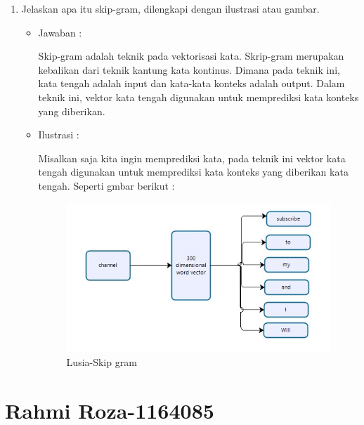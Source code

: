 \begin{enumerate}
\begin{itemize}
	\end{itemize}

\item Jelaskan apa itu skip-gram, dilengkapi dengan ilustrasi atau gambar.
	\begin{itemize}
	\item Jawaban :
		\par Skip-gram adalah teknik pada vektorisasi kata. Skrip-gram merupakan kebalikan dari teknik kantung kata kontinus. Dimana pada teknik ini, kata tengah adalah input dan kata-kata konteks adalah output. Dalam teknik ini, vektor kata tengah digunakan untuk memprediksi kata konteks yang diberikan. 

	\item Ilustrasi :
		\par Misalkan saja kita ingin memprediksi kata, pada teknik ini vektor kata tengah digunakan untuk memprediksi kata konteks yang diberikan kata tengah. Seperti gmbar berikut :
			\begin{figure}[ht]
			\centering
			\includegraphics[scale=0.5]{figures/p6.jpg}
			\caption{Lusia-Skip gram}
			\label{contoh}
			\end{figure}
	
	\end{itemize}

\end{enumerate}



\section{Rahmi Roza-1164085}
